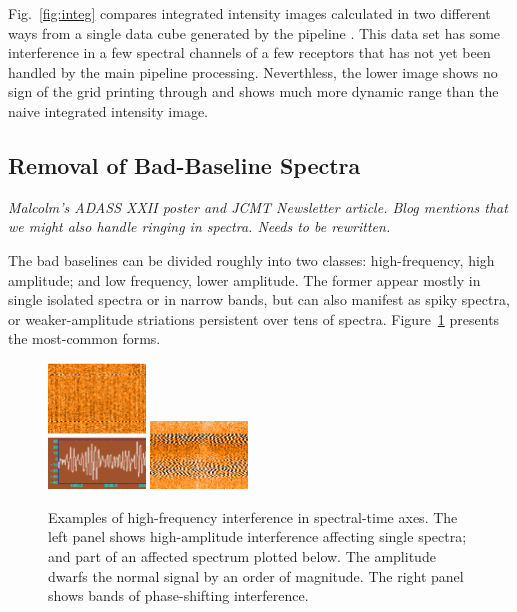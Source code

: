 \documentclass[final,authoryear,5p,times,twocolumn]{elsarticle}
\begin{document}
Fig.\ \ref{fig:integ} compares integrated intensity images calculated
in two different ways from a single data cube generated by the
pipeline \citep[see][for details of earlier
reductions of these data]{2010MNRAS.409.1412G,2010A&A...523A..29D}. This data set
has some interference in a few spectral channels of a few receptors
that has not yet been handled by the main pipeline
processing. Neverthless, the lower image shows no sign of the grid
printing through and shows much more dynamic range than the naive
integrated intensity image.

\subsection{Removal of Bad-Baseline Spectra}


\textit{\color{red} Malcolm's ADASS XXII poster and JCMT Newsletter article. Blog mentions
that we might also handle ringing in spectra. Needs to be rewritten.}

The bad baselines can be divided roughly into two classes:
high-frequency, high amplitude; and low frequency, lower
amplitude. The former appear mostly in single isolated spectra or in
narrow bands, but can also manifest as spiky spectra, or
weaker-amplitude striations persistent over tens of spectra.
Figure~\ref{fig:badbase:highfreq} presents the most-common forms.

\begin{figure}[!ht]
\includegraphics[width=0.23\textwidth]{P61_f1a}
\includegraphics[width=0.23\textwidth]{P61_f1b}
\caption{Examples of high-frequency interference in spectral-time
  axes. The left panel shows high-amplitude interference affecting
  single spectra; and part of an affected spectrum plotted below. The
  amplitude dwarfs the normal signal by an order of magnitude. The
  right panel shows bands of phase-shifting interference.}
\label{fig:badbase:highfreq}
\end{figure}
\end{document}
